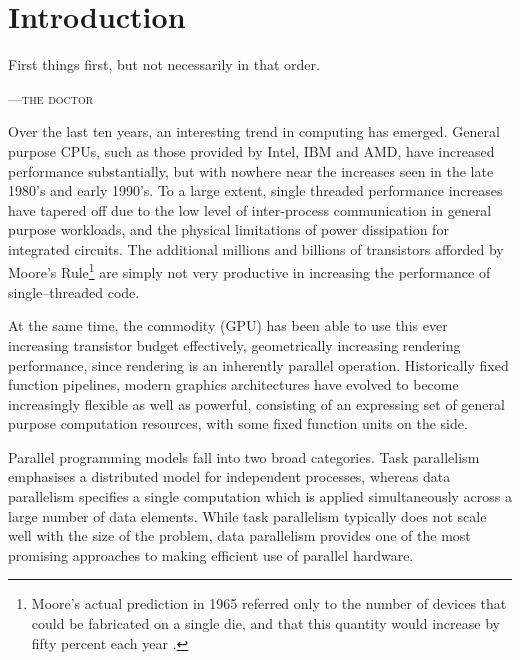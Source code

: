 %
%

\chapter{Introduction}
\epigraph{First things first, but not necessarily in that order.}
{\textsc{---the doctor}}


Over the last ten years, an interesting trend in computing has emerged. General
purpose CPUs, such as those provided by Intel, IBM and AMD, have increased
performance substantially, but with nowhere near the increases seen in the late
1980's and early 1990's. To a large extent, single threaded performance
increases have tapered off due to the low level of inter-process communication
in general purpose workloads, and the physical limitations of power dissipation
for integrated circuits. The additional millions and billions of transistors
afforded by Moore's Rule\footnote{Moore's actual prediction in 1965 referred
only to the number of devices that could be fabricated on a single die, and that
this quantity would increase by fifty percent each year \cite{Moore:1965}.} are 
simply not very
productive in increasing the performance of single--threaded code.

At the same time, the commodity  (GPU) has been
able to use this ever increasing transistor budget effectively, geometrically
increasing rendering performance, since rendering is an inherently parallel
operation. Historically fixed function pipelines, modern graphics architectures
have evolved to become increasingly flexible as well as powerful, consisting of
an expressing set of general purpose computation resources, with some fixed
function units on the side.

Parallel programming models fall into two broad categories. Task parallelism
emphasises a distributed model for independent processes, whereas data
parallelism specifies a single computation which is applied simultaneously
across a large number of data elements. While task parallelism typically does not
scale well with the size of the problem, data parallelism provides one of the
most promising approaches to making efficient use of parallel hardware.

